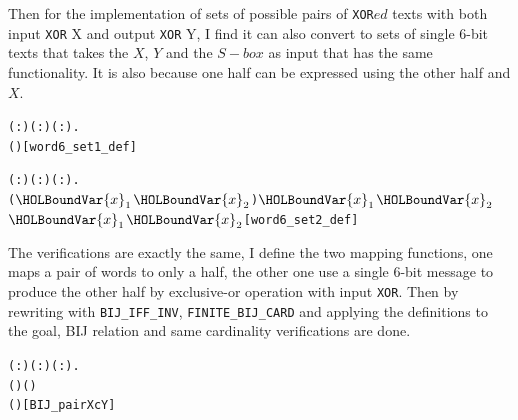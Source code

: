 \documentclass{article}
\begin{document}
Then for the implementation of sets of possible pairs of \verb|XOR|$ed$ texts with both input \verb|XOR| X and output \verb|XOR| Y,
I find it can also convert to sets of single 6-bit texts that takes the $X$, $Y$ and the $S-box$ as input that has the
same functionality. It is also because one half can be expressed using the other half and $X$.

\begin{alltt}
  \HOLTokenTurnstile{} \HOLSymConst{\HOLTokenForall{}}( :) ( :) ( :).
         \HOLSymConst{=} \HOLTokenLeftbrace{} \HOLTokenBar{}   \HOLSymConst{\HOLTokenEor{}}  ( \HOLSymConst{\HOLTokenEor{}} ) \HOLSymConst{=} \HOLTokenRightbrace{}\hfill{[word6_set1_def]}
\end{alltt}

\begin{alltt}
  \HOLTokenTurnstile{} \HOLSymConst{\HOLTokenForall{}}( :) ( :) ( :).
         \HOLSymConst{=}
     \HOLTokenLeftbrace{}(\ensuremath{\HOLBoundVar{x}\sb{\mathrm{1}}}\HOLSymConst{,}\ensuremath{\HOLBoundVar{x}\sb{\mathrm{2}}}) \HOLTokenBar{} \ensuremath{\HOLBoundVar{x}\sb{\mathrm{1}}} \HOLSymConst{\HOLTokenEor{}} \ensuremath{\HOLBoundVar{x}\sb{\mathrm{2}}} \HOLSymConst{=}  \HOLSymConst{\HOLTokenConj{}}  \ensuremath{\HOLBoundVar{x}\sb{\mathrm{1}}} \HOLSymConst{\HOLTokenEor{}}  \ensuremath{\HOLBoundVar{x}\sb{\mathrm{2}}} \HOLSymConst{=} \HOLTokenRightbrace{}\hfill{[word6_set2_def]}
\end{alltt}

The verifications are exactly the same, I define the two mapping functions, one maps a pair of words to only a half, the
other one use a single 6-bit message to produce the other half by exclusive-or operation with input \verb|XOR|. Then by rewriting
with \verb|BIJ_IFF_INV|, \verb|FINITE_BIJ_CARD| and applying the definitions to the goal, BIJ relation and same cardinality
verifications are done.

\begin{alltt}
  \HOLTokenTurnstile{} \HOLSymConst{\HOLTokenForall{}}( :) ( :) ( :).
      ( ) (   )
       (   )\hfill{[BIJ_pairXcY]}
\end{alltt}
\end{document}
